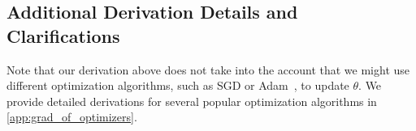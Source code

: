 

\subsection{Additional Derivation Details and Clarifications}
Note that our derivation above does not take into the account that we might use different optimization algorithms, such as SGD or Adam~\citep{adam}, to update $\theta$. We provide detailed derivations for several popular optimization algorithms in \autoref{app:grad_of_optimizers}.     

